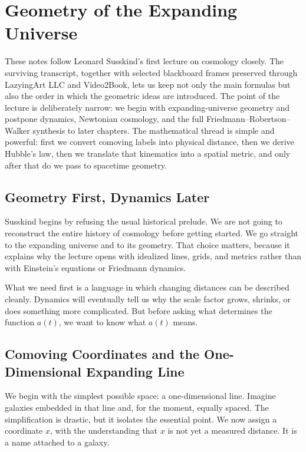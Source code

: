 \chapter{Geometry of the Expanding Universe}

These notes follow Leonard Susskind's first lecture on cosmology closely. The surviving transcript, together with selected blackboard frames preserved through LazyingArt LLC and Video2Book, lets us keep not only the main formulas but also the order in which the geometric ideas are introduced. The point of the lecture is deliberately narrow: we begin with expanding-universe geometry and postpone dynamics, Newtonian cosmology, and the full Friedmann--Robertson--Walker synthesis to later chapters. The mathematical thread is simple and powerful: first we convert comoving labels into physical distance, then we derive Hubble's law, then we translate that kinematics into a spatial metric, and only after that do we pass to spacetime geometry.

\section{Geometry First, Dynamics Later}

Susskind begins by refusing the usual historical prelude. We are not going to reconstruct the entire history of cosmology before getting started. We go straight to the expanding universe and to its geometry. That choice matters, because it explains why the lecture opens with idealized lines, grids, and metrics rather than with Einstein's equations or Friedmann dynamics.

What we need first is a language in which changing distances can be described cleanly. Dynamics will eventually tell us why the scale factor grows, shrinks, or does something more complicated. But before asking what determines the function \(a(t)\), we want to know what \(a(t)\) means.

\section{Comoving Coordinates and the One-Dimensional Expanding Line}

We begin with the simplest possible space: a one-dimensional line. Imagine galaxies embedded in that line and, for the moment, equally spaced. The simplification is drastic, but it isolates the essential point. We now assign a coordinate \(x\), with the understanding that \(x\) is not yet a measured distance. It is a name attached to a galaxy.

